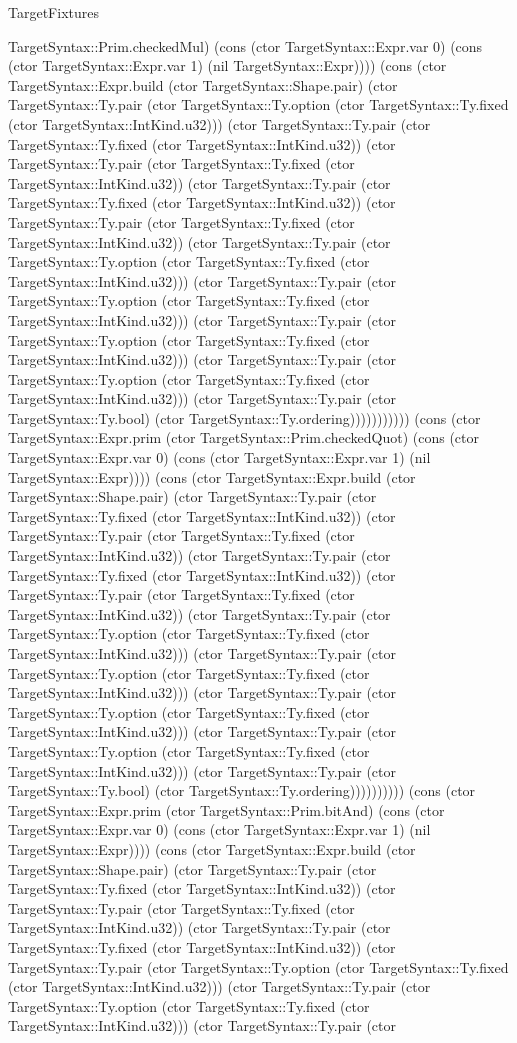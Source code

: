 \begin{lexlean}{TargetFixtures}
\begin{semanticmodule}
{TargetSyntax::Prim.checkedMul) (cons (ctor TargetSyntax::Expr.var 0) (cons (ctor TargetSyntax::Expr.var 1) (nil TargetSyntax::Expr)))) (cons (ctor TargetSyntax::Expr.build (ctor TargetSyntax::Shape.pair) (ctor TargetSyntax::Ty.pair (ctor TargetSyntax::Ty.option (ctor TargetSyntax::Ty.fixed (ctor TargetSyntax::IntKind.u32))) (ctor TargetSyntax::Ty.pair (ctor TargetSyntax::Ty.fixed (ctor TargetSyntax::IntKind.u32)) (ctor TargetSyntax::Ty.pair (ctor TargetSyntax::Ty.fixed (ctor TargetSyntax::IntKind.u32)) (ctor TargetSyntax::Ty.pair (ctor TargetSyntax::Ty.fixed (ctor TargetSyntax::IntKind.u32)) (ctor TargetSyntax::Ty.pair (ctor TargetSyntax::Ty.fixed (ctor TargetSyntax::IntKind.u32)) (ctor TargetSyntax::Ty.pair (ctor TargetSyntax::Ty.option (ctor TargetSyntax::Ty.fixed (ctor TargetSyntax::IntKind.u32))) (ctor TargetSyntax::Ty.pair (ctor TargetSyntax::Ty.option (ctor TargetSyntax::Ty.fixed (ctor TargetSyntax::IntKind.u32))) (ctor TargetSyntax::Ty.pair (ctor TargetSyntax::Ty.option (ctor TargetSyntax::Ty.fixed (ctor TargetSyntax::IntKind.u32))) (ctor TargetSyntax::Ty.pair (ctor TargetSyntax::Ty.option (ctor TargetSyntax::Ty.fixed (ctor TargetSyntax::IntKind.u32))) (ctor TargetSyntax::Ty.pair (ctor TargetSyntax::Ty.bool) (ctor TargetSyntax::Ty.ordering))))))))))) (cons (ctor TargetSyntax::Expr.prim (ctor TargetSyntax::Prim.checkedQuot) (cons (ctor TargetSyntax::Expr.var 0) (cons (ctor TargetSyntax::Expr.var 1) (nil TargetSyntax::Expr)))) (cons (ctor TargetSyntax::Expr.build (ctor TargetSyntax::Shape.pair) (ctor TargetSyntax::Ty.pair (ctor TargetSyntax::Ty.fixed (ctor TargetSyntax::IntKind.u32)) (ctor TargetSyntax::Ty.pair (ctor TargetSyntax::Ty.fixed (ctor TargetSyntax::IntKind.u32)) (ctor TargetSyntax::Ty.pair (ctor TargetSyntax::Ty.fixed (ctor TargetSyntax::IntKind.u32)) (ctor TargetSyntax::Ty.pair (ctor TargetSyntax::Ty.fixed (ctor TargetSyntax::IntKind.u32)) (ctor TargetSyntax::Ty.pair (ctor TargetSyntax::Ty.option (ctor TargetSyntax::Ty.fixed (ctor TargetSyntax::IntKind.u32))) (ctor TargetSyntax::Ty.pair (ctor TargetSyntax::Ty.option (ctor TargetSyntax::Ty.fixed (ctor TargetSyntax::IntKind.u32))) (ctor TargetSyntax::Ty.pair (ctor TargetSyntax::Ty.option (ctor TargetSyntax::Ty.fixed (ctor TargetSyntax::IntKind.u32))) (ctor TargetSyntax::Ty.pair (ctor TargetSyntax::Ty.option (ctor TargetSyntax::Ty.fixed (ctor TargetSyntax::IntKind.u32))) (ctor TargetSyntax::Ty.pair (ctor TargetSyntax::Ty.bool) (ctor TargetSyntax::Ty.ordering)))))))))) (cons (ctor TargetSyntax::Expr.prim (ctor TargetSyntax::Prim.bitAnd) (cons (ctor TargetSyntax::Expr.var 0) (cons (ctor TargetSyntax::Expr.var 1) (nil TargetSyntax::Expr)))) (cons (ctor TargetSyntax::Expr.build (ctor TargetSyntax::Shape.pair) (ctor TargetSyntax::Ty.pair (ctor TargetSyntax::Ty.fixed (ctor TargetSyntax::IntKind.u32)) (ctor TargetSyntax::Ty.pair (ctor TargetSyntax::Ty.fixed (ctor TargetSyntax::IntKind.u32)) (ctor TargetSyntax::Ty.pair (ctor TargetSyntax::Ty.fixed (ctor TargetSyntax::IntKind.u32)) (ctor TargetSyntax::Ty.pair (ctor TargetSyntax::Ty.option (ctor TargetSyntax::Ty.fixed (ctor TargetSyntax::IntKind.u32))) (ctor TargetSyntax::Ty.pair (ctor TargetSyntax::Ty.option (ctor TargetSyntax::Ty.fixed (ctor TargetSyntax::IntKind.u32))) (ctor TargetSyntax::Ty.pair (ctor }
\end{semanticmodule}
\end{lexlean}
